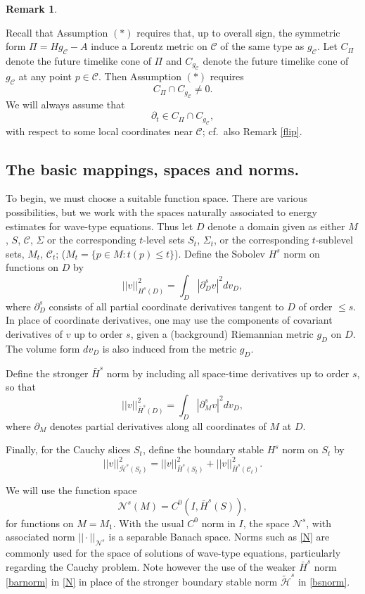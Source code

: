 \documentclass[10pt]{amsart}
\newcommand{\Si}{\Sigma}
\newcommand{\cC}{{\mathcal C}}
\newcommand{\cN}{{\mathcal N}}
\newcommand{\cH}{{\mathcal H}}
\newcommand{\be}{\begin{equation}}
\newcommand{\ee}{\end{equation}}
\newcommand{\p}{\partial}
\newcommand{\<}{\langle}
\renewcommand{\>}{\rangle}
\newcommand{\w}{\widetilde}
\theoremstyle{plain}
\theoremstyle{remark}
\theoremstyle{definition}
\newtheorem{remark}[lemma]{Remark}
\numberwithin{equation}{section}
\begin{document}
\begin{remark} \label{cones}
{\rm Recall that Assumption $(*)$ requires that, up to overall sign, the symmetric form $\Pi = Hg_{\cC} - A$ induce a Lorentz metric on $\cC$ of the same type as 
$g_{\cC}$. Let $C_{\Pi}$ denote the future timelike cone of $\Pi$ and $C_{g_{\cC}}$ denote the future timelike cone of $g_{\cC}$ at any point 
$p \in \cC$. Then Assumption $(*)$ requires 
$$C_{\Pi} \cap C_{g_{\cC}} \neq 0.$$
We will always assume that 
\be \label{pt}
\p_t \in C_{\Pi} \cap C_{g_{\cC}},
\ee
with respect to some local coordinates near $\cC$; cf.~also Remark \ref{flip}. 

}
\end{remark}

\subsection{The basic mappings, spaces and norms.}

  To begin, we must choose a suitable function space. There are various possibilities, but we work with the spaces naturally associated to 
energy estimates for wave-type equations. Thus let $D$ denote a domain given as either $M$, $S$, $\cC$, $\Si$ or the corresponding $t$-level 
sets $S_t$, $\Si_t$, or the corresponding $t$-sublevel sets, $M_t$, $\cC_t$; ($M_t = \{p \in M: t(p) \leq t\}$). Define the Sobolev $H^s$ norm on 
functions on $D$ by 
 $$||v||_{H^s(D)}^2 = \int_{D} |\p_D^s v|^2dv_D,$$
where $\p_D^s$ consists of all partial coordinate derivatives tangent to $D$ of order $\leq s$. In place of coordinate derivatives, one may use the 
components of covariant derivatives of $v$ up to order $s$, given a (background) Riemannian metric $g_D$ on $D$. The volume form $dv_D$ is also 
induced from the metric $g_{D}$.  

  Define the stronger $\bar H^s$ norm by including all space-time derivatives up to order $s$, so that 
\be \label{barnorm}  
||v||_{\bar H^s(D)}^2 = \int_{D} |\p_M^s v|^2dv_D,
\ee
where $\p_M$ denotes partial derivatives along all coordinates of $M$ at $D$. 
 
  Finally, for the Cauchy slices $S_t$, define the boundary stable $H^s$ norm on $S_t$ by 
\be \label{bsnorm}
||v||_{\bar \cH^s(S_t)}^2 = ||v||_{\bar H^s(S_t)}^2 + ||v||_{\bar H^s(\cC_t)}^2.
\ee
  
  We will use the function space  
\be \label{N}
\cN^s(M) = C^0(I, \bar H^{s}(S)),
\ee
for functions on $M = M_1$. With the usual $C^0$ norm in $I$, the space $\cN^s$, with associated norm $|| \cdot ||_{\cN^s}$ is a 
separable Banach space. Norms such as \eqref{N} are commonly used for the space of solutions of wave-type equations, 
particularly regarding the Cauchy problem. Note however the use of the weaker $\bar H^s$ norm \eqref{barnorm} in \eqref{N} in 
place of the stronger boundary stable norm $\w \cH^s$ in \eqref{bsnorm}. 
\end{document}
